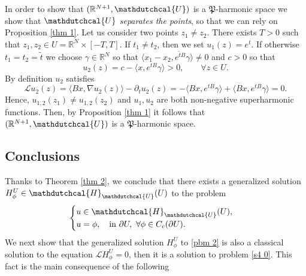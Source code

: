 \documentclass{amsart}
\numberwithin{equation}{section}
\def \p{{\phi}}
\def \Lc{{\mathcal{L}}}
\def \r{{\mathbb{R}}}
\def \Hd{{\mathdutchcal{H}}}
\def \Ud{{\mathdutchcal{U}}}
\begin{document}
{In order to show that $(\r^{N+1},\Ud)$ is a $\mathfrak{P}$-harmonic space we show that $\Ud$ \textit{separates the points}, so that we can rely on Proposition \ref {thm 1}. Let us consider two points $z_1 \neq z_2 $. There exists $T>0$ such that $z_1,z_2 \in U= \r^N \times [-T,T]$. If $t_1 \neq t_2$, then we set $u_1(z)= e^t$. If otherwise $t_1 = t_2=\tilde{t}$ we choose $\gamma \in \r^N$ so that $\langle x_1 -x_2, e^{\tilde{t}B}\gamma \rangle \neq 0$ and $c>0$ so that
$$
u_2(z) = c - \langle x, e^{t B}\gamma \rangle >0,\qquad \forall z \in U.
$$
By definition $u_2$ satisfies
$$
\Lc u_2 (z) = \langle Bx, \nabla u_2(z)\rangle -\partial_t u_2(z)= - \langle Bx, e^{t B}\gamma \rangle + \langle Bx, e^{t B}\gamma \rangle =0.
$$
Hence, $u_{1,2}(z_1) \neq u_{1,2}(z_2)$ and $u_1,u_2$ are both non-negative superharmonic functions. Then, by Proposition \ref{thm 1} it follows that $(\r^{N+1},\Ud)$ is a $\mathfrak{P}$-harmonic space.

\subsection{Conclusions}

Thanks to Theorem \ref{thm 2}, we conclude that there exists a generalized solution $H^U_\p \in \Hd_{\Ud}(U)$ to the problem 
\begin{equation} \label{pbm 2}
\begin{cases}
		u \in \Hd_{\Ud}(U),\\
		u=\p, \quad  \text{in} \  \partial U, \ \forall \p \in {C}_c(\partial U).
\end{cases}
\end{equation}
We next show that the generalized solution $H^U_\p$ to \eqref{pbm 2} is also a classical solution to the equation $\Lc H^U_\p =0$, then it is a solution to problem \eqref{s4 0}. This fact is the main consequence of the following

}
\end{document}
